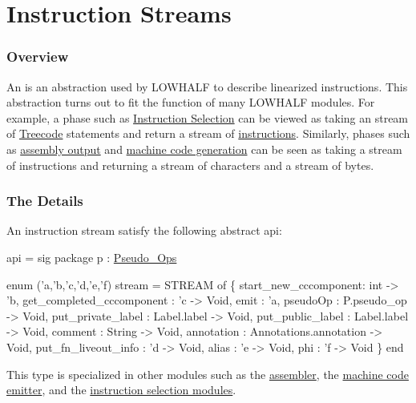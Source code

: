 \section{Instruction Streams}

\subsubsection{Overview}
An 
is an abstraction used by LOWHALF to describe linearized instructions.
This abstraction turns out to fit the function of
many LOWHALF modules.  For example,
a phase such as \href{instrsel.html}{Instruction Selection} 
can be viewed as taking an stream of 
\href{treecode.html}{Treecode} statements and return a
stream of \href{instructions.html}{instructions}.  Similarly,
phases such as \href{asm.html}{assembly output} and
\href{mc.html}{machine code generation} can be seen 
as taking a stream of instructions and 
returning a stream of characters and a stream of bytes.

\subsubsection{The Details}
An instruction stream satisfy the following abstract api:
\begin{SML}
api  =
sig
   package p : \href{pseudo-ops.html}{Pseudo_Ops}

   enum ('a,'b,'c,'d,'e,'f) stream =
      STREAM of
      \{ start_new_cccomponent: int -> 'b,  
        get_completed_cccomponent  : 'c -> Void, 
        emit        : 'a,        
        pseudoOp    : P.pseudo_op -> Void,
        put_private_label : Label.label -> Void,
        put_public_label  : Label.label -> Void,
        comment     : String -> Void,    
        annotation  : Annotations.annotation -> Void,
        put_fn_liveout_info   : 'd -> Void,
        alias       : 'e -> Void, 
        phi         : 'f -> Void  
      \}
end
\end{SML}
This type is specialized in other modules such as the
\href{asm.html}{assembler}, the \href{mc.html}{machine code emitter},
and the \href{instrsel.html}{instruction selection modules}.

